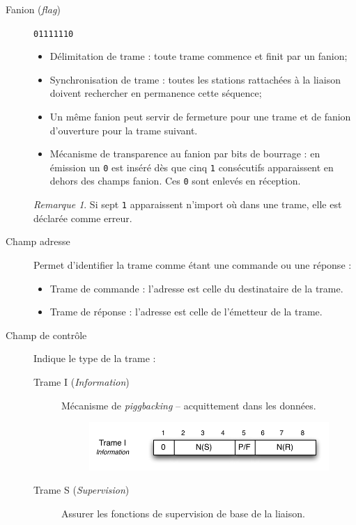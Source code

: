 \documentclass[11pt,english,french]{scrreprt}
\theoremstyle{remark}
\newtheorem*{rem*}{Remarque}
\theoremstyle{definition}
\begin{document}
\begin{description}
	\item [Fanion (\emph{flag})] \lstinline!01111110! \begin{itemize}
		\item Délimitation de trame : toute trame commence et finit par un fanion;
		\item Synchronisation de trame : toutes les stations rattachées à la liaison doivent rechercher en permanence cette séquence;
		\item Un même fanion peut servir de fermeture pour une trame et de fanion d'ouverture pour la trame suivant.
		\item Mécanisme de transparence au fanion par bits de bourrage : en émission un \lstinline!0! est inséré dès que cinq \lstinline!1! consécutifs apparaissent en dehors des champs fanion. Ces \lstinline!0! sont enlevés en réception.
	\end{itemize}
	\begin{rem*}
		Si sept \lstinline!1! apparaissent n'import où dans une trame, elle est déclarée comme erreur.
	\end{rem*}
	\item[Champ adresse] Permet d'identifier la trame comme étant une commande ou une réponse :\begin{itemize}
		\item Trame de commande : l'adresse est celle du destinataire de la trame.
		\item Trame de réponse : l'adresse est celle de l'émetteur de la trame.
	\end{itemize}
	\item[Champ de contrôle] Indique le type de la trame :\begin{description}
		\item [Trame I (\emph{Information})] Mécanisme de \emph{piggbacking} -- acquittement dans les données.
		
		\begin{figure}[h!]
			\vspace{-15pt}
			\center
			\includegraphics[scale=.75]{graphes/trameI}
			\vspace{-20pt}
		\end{figure}
		\item [Trame S (\emph{Supervision})] Assurer les fonctions de supervision de base de la liaison.
		

\end{description}
\end{description}
\end{document}
